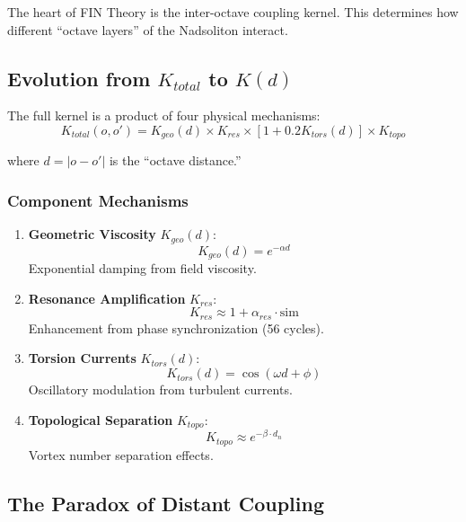 \documentclass[11pt, a4paper]{article}
\theoremstyle{remark}
\begin{document}
The heart of FIN Theory is the inter-octave coupling kernel. This determines how different ``octave layers'' of the Nadsoliton interact.

\subsection{Evolution from $K_{total}$ to $K(d)$}

The full kernel is a product of four physical mechanisms:
\begin{equation}
K_{total}(o, o') = K_{geo}(d) \times K_{res} \times [1 + 0.2 K_{tors}(d)] \times K_{topo}
\end{equation}

where $d = |o - o'|$ is the ``octave distance.''

\subsubsection{Component Mechanisms}

\begin{enumerate}
    \item \textbf{Geometric Viscosity} $K_{geo}(d)$:
    \begin{equation}
    K_{geo}(d) = e^{-\alpha d}
    \end{equation}
    Exponential damping from field viscosity.
    
    \item \textbf{Resonance Amplification} $K_{res}$:
    \begin{equation}
    K_{res} \approx 1 + \alpha_{res} \cdot \text{sim}
    \end{equation}
    Enhancement from phase synchronization (56 cycles).
    
    \item \textbf{Torsion Currents} $K_{tors}(d)$:
    \begin{equation}
    K_{tors}(d) = \cos(\omega d + \phi)
    \end{equation}
    Oscillatory modulation from turbulent currents.
    
    \item \textbf{Topological Separation} $K_{topo}$:
    \begin{equation}
    K_{topo} \approx e^{-\beta \cdot d_n}
    \end{equation}
    Vortex number separation effects.
\end{enumerate}

\subsection{The Paradox of Distant Coupling}
\end{document}
